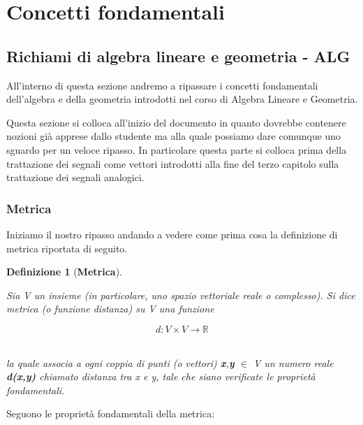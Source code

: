 \documentclass[../main.tex]{subfiles}
\begin{document}

\clearpage
\thispagestyle{empty}
\vspace*{7cm}
\section{Concetti fondamentali}
\vspace*{1.5cm}

\subsection{Richiami di algebra lineare e geometria - ALG}

All'interno di questa sezione andremo a ripassare i concetti fondamentali dell'algebra e della geometria introdotti nel corso di Algebra Lineare e Geometria.

Questa sezione si colloca all'inizio del documento in quanto dovrebbe contenere nozioni già apprese dallo studente ma alla quale possiamo dare comunque uno sguardo per un veloce ripasso.
In particolare questa parte si colloca prima della trattazione dei segnali come vettori introdotti alla fine del terzo capitolo sulla trattazione dei segnali analogici. 

\subsubsection{Metrica}

Iniziamo il nostro ripasso andando a vedere come prima cosa la definizione di metrica riportata di seguito.

\newtheorem{theorem}{Definizione}[section]

\begin{theorem}[\textbf{Metrica}]\

Sia V un insieme (in particolare, uno spazio vettoriale reale o complesso).
Si dice metrica (o funzione distanza) su  V una funzione

\[ d : V \times V \rightarrow \mathbb{R} \]\

la quale associa a ogni coppia di punti (o vettori) \textbf{x},\textbf{y} $\in$ V un numero reale \textbf{d(x,y)} chiamato distanza tra x e y, tale che siano verificate le proprietà fondamentali.

\end{theorem}

Seguono le proprietà fondamentali della metrica:
\end{document}
